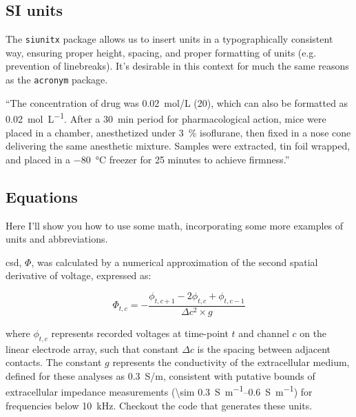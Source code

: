 \documentclass[../../main.tex]{subfiles}  %
\begin{document}
	\subsection{SI units}

	The \verb|siunitx| package allows us to insert units in a typographically consistent way, ensuring proper height, spacing, and proper formatting of units (e.g. prevention of linebreaks).
	It's desirable in this context for much the same reasons as the \verb|acronym| package.
	\begin{displayquote}
		``The concentration of drug was \SI[per-mode=fraction]{0.02}{\mol/\L} (\SI{20}{\mM}), which can also be formatted as \SI[per-mode=fraction]{0.02}{\mol\per\L}.
		After a \SI{30}{\minute} period for pharmacological action, mice were placed in a chamber, anesthetized under \qty{3}{\percent} isoflurane, then fixed in a nose cone delivering the same anesthetic mixture. 
		Samples were extracted, tin foil wrapped, and placed in a \SI{-80}{\degreeCelsius} freezer for 25 minutes to achieve firmness.''
	\end{displayquote}

	\subsection{Equations}

	Here I'll show you how to use some math, incorporating some more examples of units and abbreviations.

	\Acrfull{csd}, $\Phi$, was calculated by a numerical approximation of the second spatial derivative of voltage, expressed as:

	\begin{equation}
		\Phi_{t, c} = -\frac{\phi_{t, c+1} - 2\phi_{t, c} + \phi_{t, c-1}}{\Delta c^2 \times g}
	\end{equation}

	where $\phi_{t, c}$ represents recorded voltages at time-point $t$ and channel $c$ on the linear electrode array, such that constant $\Delta c$ is the spacing between adjacent contacts. 
	The constant $g$ represents the conductivity of the extracellular medium, defined for these analyses as \SI[per-mode=fraction]{0.3}{\siemens/\m}, consistent with putative bounds of extracellular impedance measurements (\qtyrange[range-units=single,range-phrase=-]{\sim 0.3}{0.6}{\siemens\per\m}) for frequencies below \SI{10}{\kHz}. 
	Checkout the code that generates these units. 
\end{document}
